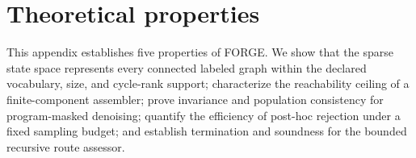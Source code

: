 \documentclass{article}
\begin{document}
\begin{table}[H]
\caption{\textbf{Finite component inventories and source-product coverage.}
Inventory size counts unique constitutional components visible to the method at generation time.
Product coverage requires that every required role component is present in that inventory.
The held-component fold is never used to construct an inventory.}
\label{tab:baseline-inventory-coverage}
\centering
\scriptsize
\setlength{\tabcolsep}{4.0pt}
\end{table}

\clearpage

\clearpage

\section{Theoretical properties}
\label{app:theory}

This appendix establishes five properties of FORGE.
We show that the sparse state space represents every connected labeled graph within the declared
vocabulary, size, and cycle-rank support; characterize the reachability ceiling of a finite-component
assembler; prove invariance and population consistency for program-masked denoising; quantify the
efficiency of post-hoc rejection under a fixed sampling budget; and establish termination and
soundness for the bounded recursive route assessor.
\end{document}
